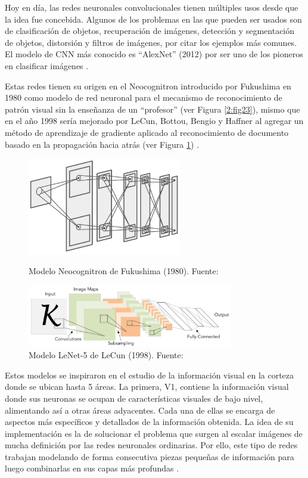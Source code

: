 \begin{itemize}
\begin{itemize}
		Hoy en día, las redes neuronales convolucionales tienen múltiples usos desde que la idea fue concebida. Algunos de los problemas en las que pueden ser usados son de clasificación de objetos, recuperación de imágenes, detección y segmentación de objetos, distorsión y filtros de imágenes, por citar los ejemplos más comunes. El modelo de CNN más conocido es “AlexNet” (2012) por ser uno de los pioneros en clasificar imágenes \parencite{tec_li2019cnn}.
		
		Estas redes tienen su origen en el Neocognitron introducido por Fukushima en 1980 como modelo de red neuronal para el mecanismo de reconocimiento de patrón visual sin la enseñanza de un “profesor” (ver Figura \ref{2:fig23}), mismo que en el año 1998 sería mejorado por LeCun, Bottou, Bengio y Haffner al agregar un método de aprendizaje de gradiente aplicado al reconocimiento de documento basado en la propagación hacia atrás (ver Figura \ref{2:fig24}) \parencite{tec_li2019cnn}.
		\begin{figure}[htbp]
			\begin{center}
				\includegraphics[width=0.6\textwidth]{2/figures/neocognitron.jpg}
				\caption[Modelo Neocognitron de Fukushima (1980)]{Modelo Neocognitron de Fukushima (1980). Fuente: \cite{tec_li2019cnn}}
				\label{2:fig23}
				
				\includegraphics[width=0.8\textwidth]{2/figures/lenet5.jpg}
				\caption[Modelo LeNet-5 de LeCun (1998)]{Modelo LeNet-5 de LeCun (1998). Fuente: \cite{tec_li2019cnn}}
				\label{2:fig24}
			\end{center}
		\end{figure}
		
		Estos modelos se inspiraron en el estudio de la información visual en la corteza donde se ubican hasta 5 áreas. La primera, V1, contiene la información visual donde sus neuronas se ocupan de características visuales de bajo nivel, alimentando así a otras áreas adyacentes. Cada una de ellas se encarga de aspectos más específicos y detallados de la información obtenida. La idea de su implementación es la de solucionar el problema que surgen al escalar imágenes de mucha definición por las redes neuronales ordinarias. Por ello, este tipo de redes trabajan modelando de forma consecutiva piezas pequeñas de información para luego combinarlas en sus capas más profundas \parencite{tec_lopez2016cnnTF}.
		

\end{itemize}
\end{itemize}
